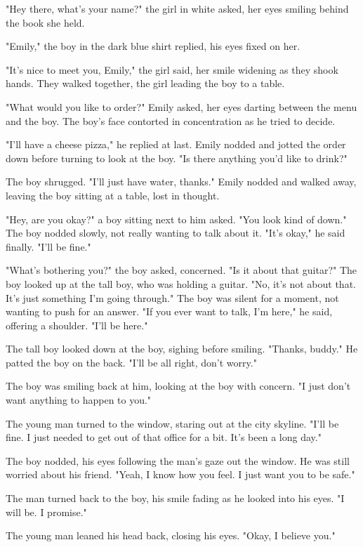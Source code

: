 \documentclass[smalldemyvopaper,11pt,twoside,onecolumn,openright,extrafontsizes]{memoir}
\begin{document}
"Hey there, what's your name?" the girl in white asked, her eyes smiling behind the book she held.\par
"Emily," the boy in the dark blue shirt replied, his eyes fixed on her.\par
"It's nice to meet you, Emily," the girl said, her smile widening as they shook hands. They walked together, the girl leading the boy to a table.\par
"What would you like to order?" Emily asked, her eyes darting between the menu and the boy. The boy's face contorted in concentration as he tried to decide.\par
"I'll have a cheese pizza," he replied at last. Emily nodded and jotted the order down before turning to look at the boy. "Is there anything you'd like to drink?"\par
The boy shrugged. "I'll just have water, thanks." Emily nodded and walked away, leaving the boy sitting at a table, lost in thought.\par
"Hey, are you okay?" a boy sitting next to him asked. "You look kind of down." The boy nodded slowly, not really wanting to talk about it. "It's okay," he said finally. "I'll be fine."\par
"What's bothering you?" the boy asked, concerned. "Is it about that guitar?" The boy looked up at the tall boy, who was holding a guitar. "No, it's not about that. It's just something I'm going through." The boy was silent for a moment, not wanting to push for an answer. "If you ever want to talk, I'm here," he said, offering a shoulder. "I'll be here."\par
The tall boy looked down at the boy, sighing before smiling. "Thanks, buddy." He patted the boy on the back. "I'll be all right, don't worry."\par
The boy was smiling back at him, looking at the boy with concern. "I just don't want anything to happen to you."\par
The young man turned to the window, staring out at the city skyline. "I'll be fine. I just needed to get out of that office for a bit. It's been a long day."\par
The boy nodded, his eyes following the man's gaze out the window. He was still worried about his friend. "Yeah, I know how you feel. I just want you to be safe."\par
The man turned back to the boy, his smile fading as he looked into his eyes. "I will be. I promise."\par
The young man leaned his head back, closing his eyes. "Okay, I believe you."\par
\end{document}
